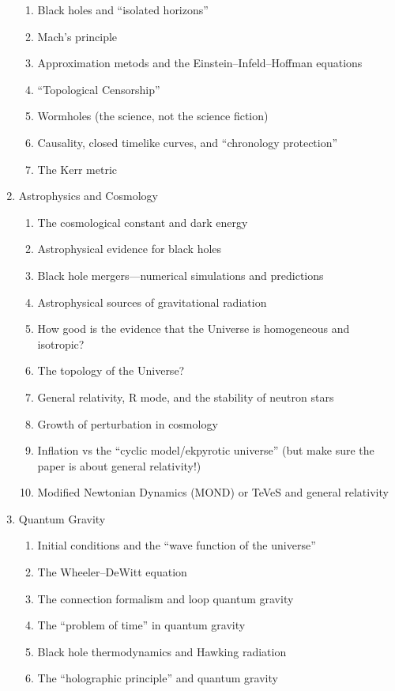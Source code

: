 \begin{enumerate}
\begin{enumerate}
  \item Black holes and ``isolated horizons''
  \item Mach's principle
  \item Approximation metods and the Einstein--Infeld--Hoffman equations
  \item ``Topological Censorship''
  \item Wormholes (the science, not the science fiction)
  \item Causality, closed timelike curves, and ``chronology protection''
  \item The Kerr metric
  \end{enumerate}
\item Astrophysics and Cosmology
  \begin{enumerate}
  \item The cosmological constant and dark energy
  \item Astrophysical evidence for black holes
  \item Black hole mergers---numerical simulations and predictions
  \item Astrophysical sources of gravitational radiation
  \item How good is the evidence that the Universe is homogeneous and isotropic?
  \item The topology of the Universe?
  \item General relativity, R mode, and the stability of neutron stars
  \item Growth of perturbation in cosmology
  \item Inflation vs the ``cyclic model/ekpyrotic universe'' (but make
    sure the paper is about general relativity!)
  \item Modified Newtonian Dynamics (MOND) or TeVeS and general relativity
  \end{enumerate}
\item Quantum Gravity
  \begin{enumerate}
  \item Initial conditions and the ``wave function of the universe''
  \item The Wheeler--DeWitt equation
  \item The connection formalism and loop quantum gravity
  \item The ``problem of time'' in quantum gravity
  \item Black hole thermodynamics and Hawking radiation
  \item The ``holographic principle'' and quantum gravity

\end{enumerate}
\end{enumerate}
